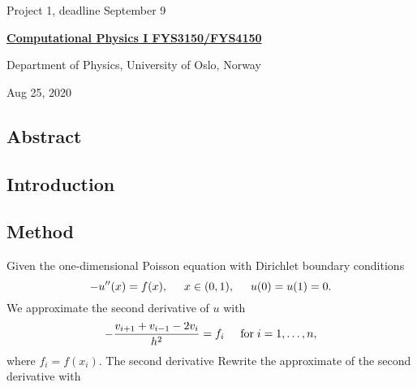 \documentclass[%
oneside,                 %
final,                   %
10pt]{article}
\begin{document}

\newcommand{\exercisesection}[1]{\subsection*{#1}}






\thispagestyle{empty}

\begin{center}
{\LARGE\bf
\begin{spacing}{1.25}
Project 1, deadline  September 9
\end{spacing}
}
\end{center}


\begin{center}
{\bf \href{{http://www.uio.no/studier/emner/matnat/fys/FYS3150/index-eng.html}}{Computational Physics I FYS3150/FYS4150}}
\end{center}

    \begin{center}
\centerline{{\small Department of Physics, University of Oslo, Norway}}
\end{center}
    

\begin{center}
Aug 25, 2020
\end{center}

\vspace{1cm}

\subsection*{Abstract}
\subsection*{Introduction}
\subsection*{Method}
Given the one-dimensional Poisson equation with Dirichlet boundary conditions
\begin{equation*}
-u''(x) = f(x), \hspace{0.5cm} x\in(0,1), \hspace{0.5cm} u(0) = u(1) = 0.
\end{equation*}
We approximate the second derivative of $u$ with
\begin{equation*}
   -\frac{v_{i+1}+v_{i-1}-2v_i}{h^2} = f_i  \hspace{0.5cm} \mathrm{for} \hspace{0.1cm} i=1,\dots, n,
\end{equation*}
where $f_i=f(x_i)$.
The second derivative
Rewrite the approximate of the second derivative with
\end{document}
